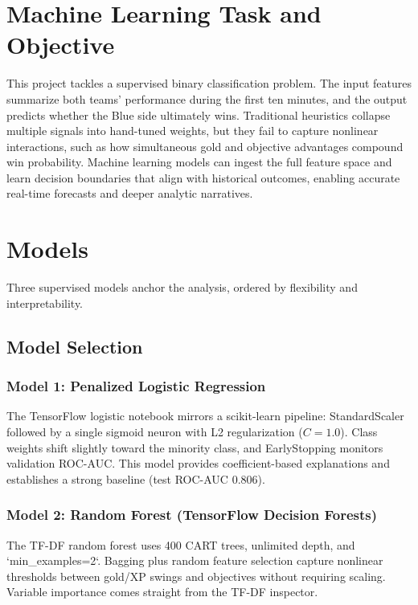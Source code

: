 \documentclass[aps,prl,preprint,groupedaddress]{revtex4-2}
\begin{document}
\section{Machine Learning Task and Objective}
\label{sec:ml_task}

This project tackles a supervised binary classification problem. The input features summarize both teams' performance during the first ten minutes, and the output predicts whether the Blue side ultimately wins. Traditional heuristics collapse multiple signals into hand-tuned weights, but they fail to capture nonlinear interactions, such as how simultaneous gold and objective advantages compound win probability. Machine learning models can ingest the full feature space and learn decision boundaries that align with historical outcomes, enabling accurate real-time forecasts and deeper analytic narratives.

\section{Models}
\label{sec:models}

Three supervised models anchor the analysis, ordered by flexibility and interpretability.

\subsection{Model Selection}

\subsubsection{Model 1: Penalized Logistic Regression}
The TensorFlow logistic notebook mirrors a scikit-learn pipeline: StandardScaler followed by a single sigmoid neuron with L2 regularization ($C=1.0$). Class weights shift slightly toward the minority class, and EarlyStopping monitors validation ROC-AUC. This model provides coefficient-based explanations and establishes a strong baseline (test ROC-AUC 0.806).

\subsubsection{Model 2: Random Forest (TensorFlow Decision Forests)}
The TF-DF random forest uses 400 CART trees, unlimited depth, and `min_examples=2`. Bagging plus random feature selection capture nonlinear thresholds between gold/XP swings and objectives without requiring scaling. Variable importance comes straight from the TF-DF inspector.
\end{document}
